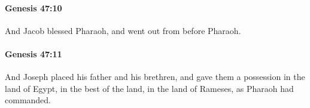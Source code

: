		\paragraph{Genesis 47:10} %
			\label{GENESIS-47-10}

			And Jacob blessed Pharaoh, and went out from before Pharaoh.


		\paragraph{Genesis 47:11} %
			\label{GENESIS-47-11}

			And Joseph placed his father and his brethren, and gave them a possession in the land of Egypt, in the best of the land, in the land of Rameses, as Pharaoh had commanded.


